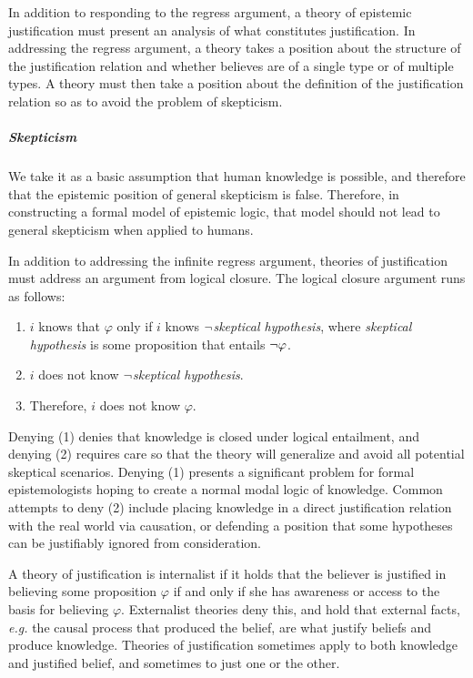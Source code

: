 In addition to responding to the regress argument, a theory of epistemic justification must present an analysis of what constitutes justification. In addressing the regress argument, a theory takes a position about the structure of the justification relation and whether believes are of a single type or of multiple types. A theory must then take a position about the definition of the justification relation so as to avoid the problem of skepticism.


\subparagraph{Skepticism}
We take it as a basic assumption that human knowledge is possible, and therefore that the epistemic position of general skepticism is false. Therefore, in constructing a formal model of epistemic logic, that model should not lead to general skepticism when applied to humans. 

In addition to addressing the infinite regress argument, theories of justification must address an argument from logical closure. The logical closure argument runs as follows:
\begin{enumerate}
	\item $i$ knows that $\varphi$ only if $i$ knows ${\neg}$\emph{skeptical hypothesis}, where \emph{skeptical hypothesis} is some proposition that entails ${\neg} \varphi$.
	\item $i$ does not know ${\neg}$\emph{skeptical hypothesis}.
	\item Therefore, $i$ does not know $\varphi$.
\end{enumerate}

Denying (1) denies that knowledge is closed under logical entailment, and denying (2) requires care so that the theory will generalize and avoid all potential skeptical scenarios. Denying (1) presents a significant problem for formal epistemologists hoping to create a normal modal logic of knowledge. Common attempts to deny (2) include placing knowledge in a direct justification relation with the real world via causation, or defending a position that some hypotheses can be justifiably ignored from consideration. 

A theory of justification is internalist if it holds that the believer is justified in believing some proposition $\varphi$ if and only if she has awareness or access to the basis for believing $\varphi$. Externalist theories deny this, and hold that external facts, \emph{e.g.} the causal process that produced the belief, are what justify beliefs and produce knowledge. Theories of justification sometimes apply to both knowledge and justified belief, and sometimes to just one or the other.

